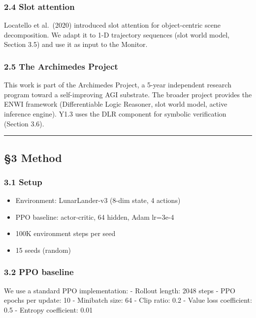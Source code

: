 \documentclass[
]{article}
\providecommand{\tightlist}{%
  \setlength{\itemsep}{0pt}\setlength{\parskip}{0pt}}
\begin{document}
\subsubsection{2.4 Slot attention}\label{slot-attention}

Locatello et al.~(2020) introduced slot attention for object-centric
scene decomposition. We adapt it to 1-D trajectory sequences (slot world
model, Section 3.5) and use it as input to the Monitor.

\subsubsection{2.5 The Archimedes Project}\label{the-archimedes-project}

This work is part of the Archimedes Project, a 5-year independent
research program toward a self-improving AGI substrate. The broader
project provides the ENWI framework (Differentiable Logic Reasoner, slot
world model, active inference engine). Y1.3 uses the DLR component for
symbolic verification (Section 3.6).

\begin{center}\rule{0.5\linewidth}{0.5pt}\end{center}

\subsection{§3 Method}\label{method}

\subsubsection{3.1 Setup}\label{setup}

\begin{itemize}
\tightlist
\item
  Environment: LunarLander-v3 (8-dim state, 4 actions)
\item
  PPO baseline: actor-critic, 64 hidden, Adam lr=3e-4
\item
  100K environment steps per seed
\item
  15 seeds (random)
\end{itemize}

\subsubsection{3.2 PPO baseline}\label{ppo-baseline}

We use a standard PPO implementation: - Rollout length: 2048 steps - PPO
epochs per update: 10 - Minibatch size: 64 - Clip ratio: 0.2 - Value
loss coefficient: 0.5 - Entropy coefficient: 0.01
\end{document}
